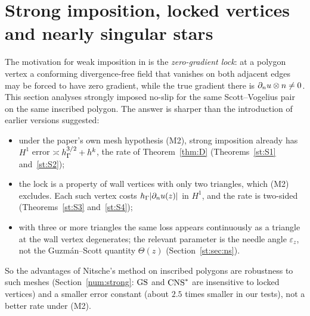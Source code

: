 \section{Strong imposition, locked vertices and nearly singular stars}\label{st:sec}

The motivation for weak imposition in \cite{GjerdeScott2024,ScottPrize} is the \emph{zero-gradient lock}: at a polygon vertex a conforming divergence-free field that vanishes on both adjacent edges may be forced to have zero gradient, while the true gradient there is $\partial_n u\otimes n\ne0$. This section analyses strongly imposed no-slip for the same Scott--Vogelius pair on the same inscribed polygon. The answer is sharper than the introduction of earlier versions suggested:
\begin{itemize}
\item under the paper's own mesh hypothesis (M2), strong imposition already has $H^1$ error $\asymp h_\Gamma^{3/2}+h^k$, the rate of Theorem~\ref{thm:D} (Theorems~\ref{st:S1} and~\ref{st:S2});
\item the lock is a property of wall vertices with only two triangles, which (M2) excludes. Each such vertex costs $h_\Gamma|\partial_n u(z)|$ in $H^1$, and the rate is two-sided (Theorems~\ref{st:S3} and~\ref{st:S4});
\item with three or more triangles the same loss appears continuously as a triangle at the wall vertex degenerates; the relevant parameter is the needle angle $\varepsilon_z$, not the Guzm\'an--Scott quantity $\Theta(z)$ (Section~\ref{st:sec:ns}).
\end{itemize}
So the advantages of Nitsche's method on inscribed polygons are robustness to such meshes (Section~\ref{num:strong}: $\mathrm{GS}$ and $\mathrm{CNS}^\ast$ are insensitive to locked vertices) and a smaller error constant (about $2.5$ times smaller in our tests), not a better rate under (M2).

